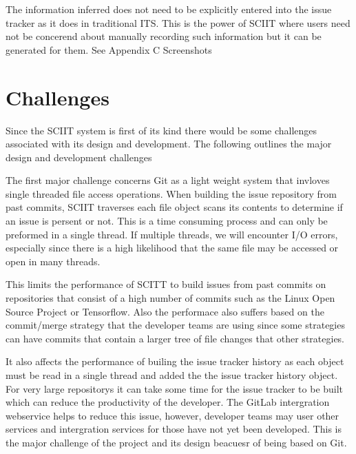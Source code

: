 \documentclass{mproj}
\begin{document}
The information inferred does not need to be explicitly entered into the issue tracker as it does in traditional ITS. This is the power of SCIIT where users need not be concerend about manually recording such information but it can be generated for them. See Appendix C Screenshots %



\section{Challenges}

Since the SCIIT system is first of its kind there would be some challenges associated with its design and development. The following outlines the major design and development challenges

The first major challenge concerns Git as a light weight system that invloves single threaded file access operations. When building the issue repository from past commits, SCIIT traverses each file object scans its contents to determine if an issue is persent or not. This is a time consuming process and can only be preformed in a single thread. If multiple threads, we will encounter I/O errors, especially since there is a high likelihood that the same file may be accessed or open in many threads. 

This limits the performance of SCITT to build issues from past commits on repositories that consist of a high number of commits such as the Linux Open Source Project or Tensorflow. Also the performace also suffers based on the commit/merge strategy that the developer teams are using since some strategies can have commits that contain a larger tree of file changes that other strategies. 

It also affects the performance of builing the issue tracker history as each object must be read in a single thread and added the the issue tracker history object. For very large repositorys it can take some time for the issue tracker to be built which can reduce the productivity of the developer. The GitLab intergration webservice helps to reduce this issue, however, developer teams may user other services and intergration services for those have not yet been developed. This is the major challenge of the project and its design beacuesr of being based on Git. %
\end{document}
